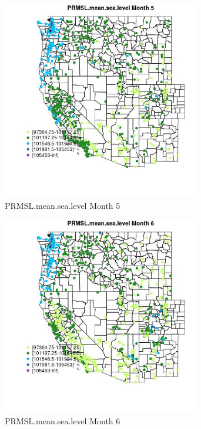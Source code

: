 \begin{figure} 
\centering  
\includegraphics[width=0.77\textwidth]{Code_Outputs/Report_ML_input_PM25_Step4_part_e_de_duplicated_aves_compiled_2019-05-21wNAs_MapObsMo5PRMSLmeansealevel.jpg} 
\caption{\label{fig:Report_ML_input_PM25_Step4_part_e_de_duplicated_aves_compiled_2019-05-21wNAsMapObsMo5PRMSLmeansealevel}PRMSL.mean.sea.level Month 5} 
\end{figure} 
 

\begin{figure} 
\centering  
\includegraphics[width=0.77\textwidth]{Code_Outputs/Report_ML_input_PM25_Step4_part_e_de_duplicated_aves_compiled_2019-05-21wNAs_MapObsMo6PRMSLmeansealevel.jpg} 
\caption{\label{fig:Report_ML_input_PM25_Step4_part_e_de_duplicated_aves_compiled_2019-05-21wNAsMapObsMo6PRMSLmeansealevel}PRMSL.mean.sea.level Month 6} 
\end{figure} 
 

